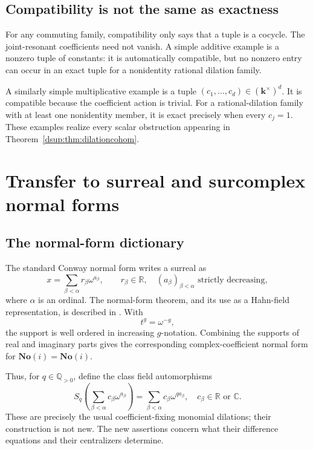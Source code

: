 \documentclass[11pt,oneside]{article}
\numberwithin{equation}{section}
\theoremstyle{definition}
\theoremstyle{remark}
\newcommand{\No}{\mathbf{No}}
\newcommand{\SC}{\No(i)}
\newcommand{\R}{\mathbb R}
\newcommand{\C}{\mathbb C}
\newcommand{\Q}{\mathbb Q}
\newcommand{\kk}{\mathbf k}
\begin{document}
\subsection{Compatibility is not the same as exactness}

For any commuting family, compatibility only says that a tuple is a
cocycle. The joint-resonant coefficients need not vanish. A simple
additive example is a nonzero tuple of constants: it is automatically
compatible, but no nonzero entry can occur in an exact tuple for a
nonidentity rational dilation family.

A similarly simple multiplicative example is a tuple
$(c_1,\ldots,c_d)\in(\kk^\times)^d$. It is compatible because the
coefficient action is trivial. For a rational-dilation family with at
least one nonidentity member, it is exact precisely when every $c_j=1$.
These examples realize every scalar obstruction appearing in
Theorem~\ref{dsup:thm:dilationcohom}.

\section{Transfer to surreal and surcomplex normal forms}\label{dsup:sec:surreal}

\subsection{The normal-form dictionary}

The standard Conway normal form writes a surreal as
\[
 x=\sum_{\beta<\alpha}r_\beta\omega^{a_\beta},
 \qquad r_\beta\in\R,
 \quad (a_\beta)_{\beta<\alpha}\text{ strictly decreasing},
\]
where $\alpha$ is an ordinal. The normal-form theorem, and its use as a
Hahn-field representation, is described in \cite{KKS}. With
\begin{equation}\label{dsup:eq:surrealdictionary}
 t^g=\omega^{-g},
\end{equation}
the support is well ordered in increasing $g$-notation. Combining the
supports of real and imaginary parts gives the corresponding
complex-coefficient normal form for $\SC=\No(i)$.

Thus, for $q\in\Q_{>0}$, define the class field automorphisms
\begin{equation}\label{dsup:eq:surrealdilation}
 S_q\left(\sum_{\beta<\alpha}c_\beta\omega^{a_\beta}\right)
       =\sum_{\beta<\alpha}c_\beta\omega^{qa_\beta},
 \quad c_\beta\in\R\text{ or }\C.
\end{equation}
These are precisely the usual coefficient-fixing monomial dilations;
their construction is not new. The new assertions concern what their
difference equations and their centralizers determine.
\end{document}
